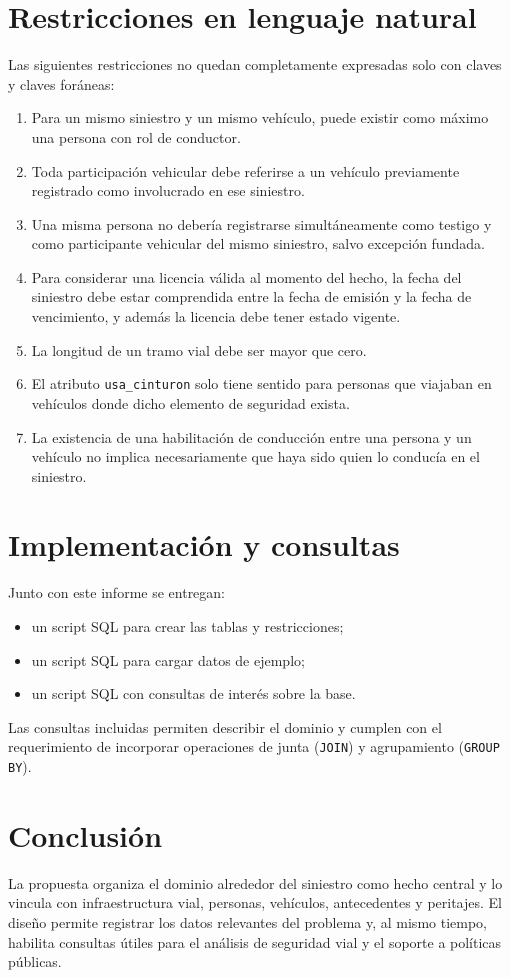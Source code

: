 \documentclass[12pt,a4paper]{article}
\begin{document}
\section{Restricciones en lenguaje natural}

Las siguientes restricciones no quedan completamente expresadas solo con claves y claves foráneas:

\begin{enumerate}[leftmargin=*]
    \item Para un mismo siniestro y un mismo vehículo, puede existir como máximo una persona con rol de conductor.
    \item Toda participación vehicular debe referirse a un vehículo previamente registrado como involucrado en ese siniestro.
    \item Una misma persona no debería registrarse simultáneamente como testigo y como participante vehicular del mismo siniestro, salvo excepción fundada.
    \item Para considerar una licencia válida al momento del hecho, la fecha del siniestro debe estar comprendida entre la fecha de emisión y la fecha de vencimiento, y además la licencia debe tener estado vigente.
    \item La longitud de un tramo vial debe ser mayor que cero.
    \item El atributo \texttt{usa\_cinturon} solo tiene sentido para personas que viajaban en vehículos donde dicho elemento de seguridad exista.
    \item La existencia de una habilitación de conducción entre una persona y un vehículo no implica necesariamente que haya sido quien lo conducía en el siniestro.
\end{enumerate}

\section{Implementación y consultas}

Junto con este informe se entregan:

\begin{itemize}[leftmargin=*]
    \item un script SQL para crear las tablas y restricciones;
    \item un script SQL para cargar datos de ejemplo;
    \item un script SQL con consultas de interés sobre la base.
\end{itemize}

Las consultas incluidas permiten describir el dominio y cumplen con el requerimiento de incorporar operaciones de junta (\texttt{JOIN}) y agrupamiento (\texttt{GROUP BY}).

\section{Conclusión}

La propuesta organiza el dominio alrededor del siniestro como hecho central y lo vincula con infraestructura vial, personas, vehículos, antecedentes y peritajes. El diseño permite registrar los datos relevantes del problema y, al mismo tiempo, habilita consultas útiles para el análisis de seguridad vial y el soporte a políticas públicas.
\end{document}
